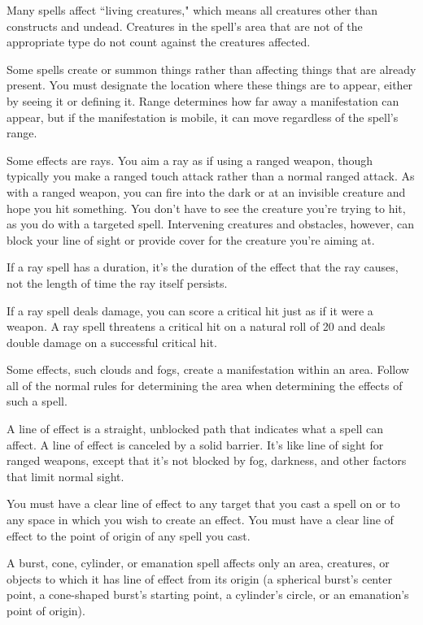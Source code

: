 Many spells affect ``living creatures," which means all creatures other than constructs and undead. Creatures in the spell's area that are not of the appropriate type do not count against the creatures affected.

 Some spells create or summon things rather than affecting things that are already present. You must designate the location where these things are to appear, either by seeing it or defining it. Range determines how far away a manifestation can appear, but if the manifestation is mobile, it can move regardless of the spell's range.

 Some effects are rays. You aim a ray as if using a ranged weapon, though typically you make a ranged touch attack rather than a normal ranged attack. As with a ranged weapon, you can fire into the dark or at an invisible creature and hope you hit something. You don't have to see the creature you're trying to hit, as you do with a targeted spell. Intervening creatures and obstacles, however, can block your line of sight or provide cover for the creature you're aiming at.

If a ray spell has a duration, it's the duration of the effect that the ray causes, not the length of time the ray itself persists.

If a ray spell deals damage, you can score a critical hit just as if it were a weapon. A ray spell threatens a critical hit on a natural roll of 20 and deals double damage on a successful critical hit.

 Some effects, such clouds and fogs, create a manifestation within an area. Follow all of the normal rules for determining the area when determining the effects of such a spell.

 A line of effect is a straight, unblocked path that indicates what a spell can affect. A line of effect is canceled by a solid barrier. It's like line of sight for ranged weapons, except that it's not blocked by fog, darkness, and other factors that limit normal sight.

You must have a clear line of effect to any target that you cast a spell on or to any space in which you wish to create an effect. You must have a clear line of effect to the point of origin of any spell you cast.

A burst, cone, cylinder, or emanation spell affects only an area, creatures, or objects to which it has line of effect from its origin (a spherical burst's center point, a cone-shaped burst's starting point, a cylinder's circle, or an emanation's point of origin).

